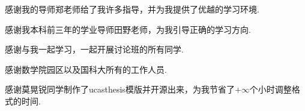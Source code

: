感谢我的导师郑老师给了我许多指导，并为我提供了优越的学习环境.

感谢我本科前三年的学业导师田野老师，为我引导正确的学习方向.

感谢与我一起学习，一起开展讨论班的所有同学.

感谢数学院园区以及国科大所有的工作人员.

感谢莫晃锐同学制作了ucasthesis模版并开源出来，为我节省了$+\infty$个小时调整格式的时间.
